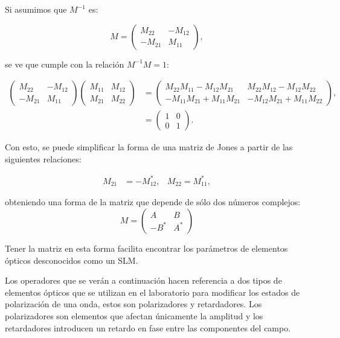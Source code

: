 \begin{enumerate}
Si asumimos que $M^{-1}$ es:

\begin{equation*}
  M=
  \begin{pmatrix}
    M_{22}&-M_{12}\\-M_{21}&M_{11}
  \end{pmatrix},
\end{equation*}

se ve que cumple con la relación $M^{-1}M = 1$:

\begin{align*}
    \begin{pmatrix}
    M_{22}&-M_{12}\\-M_{21}&M_{11}
  \end{pmatrix}
\begin{pmatrix}
      M_{11}&M_{12}\\M_{21} & M_{22}
    \end{pmatrix}
&=
    \begin{pmatrix}
 M_{22}M_{11}-M_{12}M_{21}     & M_{22}M_{12}-M_{12}M_{22}\\
-M_{11}M_{21}+M_{11}M_{21}    & -M_{12}M_{21} + M_{11}M_{22} 
    \end{pmatrix},\\
&=
\begin{pmatrix}
  1 &0\\0&1
\end{pmatrix}.
\end{align*}

Con esto, se puede simplificar la forma de una matriz de Jones a
partir de las siguientes relaciones:

\begin{align*}
  M_{21} &= - M_{12}^*, & M_{22} = M_{11}^*,
\end{align*}

obteniendo una forma de la matriz que depende de sólo dos números
complejos:
\begin{equation}
  M=
  \begin{pmatrix}
    A & B \\-B^* & A^*
  \end{pmatrix}
\label{eq:general_jones_matrix}
\end{equation}

Tener la matriz en esta forma facilita encontrar los parámetros de elementos
ópticos desconocidos como un SLM.

\end{enumerate}

Los operadores que se verán a
continuación hacen referencia a dos tipos de elementos ópticos que se
utilizan en el laboratorio para modificar los estados de polarización
de una onda, estos son polarizadores y retardadores. Los polarizadores
son elementos que afectan únicamente la amplitud y los
retardadores introducen un retardo en fase entre las componentes del campo.

